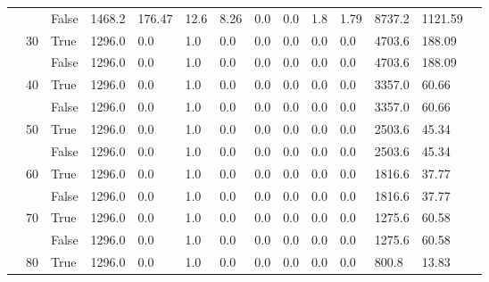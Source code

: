 \documentclass{article}
\begin{document}
\begin{landscape}
\begin{small}
\begin{longtable}[c]{@{}lll|ll|ll|ll|ll|lll@{}}
   &    & False & 1468.2          & 176.47         & 12.6          & 8.26          & 0.0           & 0.0           & 1.8           & 1.79          & 8737.2        & 1121.59     &  \\
   & 30 & True  & 1296.0          & 0.0            & 1.0           & 0.0           & 0.0           & 0.0           & 0.0           & 0.0           & 4703.6        & 188.09      &  \\
   &    & False & 1296.0          & 0.0            & 1.0           & 0.0           & 0.0           & 0.0           & 0.0           & 0.0           & 4703.6        & 188.09      &  \\
   & 40 & True  & 1296.0          & 0.0            & 1.0           & 0.0           & 0.0           & 0.0           & 0.0           & 0.0           & 3357.0        & 60.66       &  \\
   &    & False & 1296.0          & 0.0            & 1.0           & 0.0           & 0.0           & 0.0           & 0.0           & 0.0           & 3357.0        & 60.66       &  \\
   & 50 & True  & 1296.0          & 0.0            & 1.0           & 0.0           & 0.0           & 0.0           & 0.0           & 0.0           & 2503.6        & 45.34       &  \\
   &    & False & 1296.0          & 0.0            & 1.0           & 0.0           & 0.0           & 0.0           & 0.0           & 0.0           & 2503.6        & 45.34       &  \\
   & 60 & True  & 1296.0          & 0.0            & 1.0           & 0.0           & 0.0           & 0.0           & 0.0           & 0.0           & 1816.6        & 37.77       &  \\
   &    & False & 1296.0          & 0.0            & 1.0           & 0.0           & 0.0           & 0.0           & 0.0           & 0.0           & 1816.6        & 37.77       &  \\
   & 70 & True  & 1296.0          & 0.0            & 1.0           & 0.0           & 0.0           & 0.0           & 0.0           & 0.0           & 1275.6        & 60.58       &  \\
   &    & False & 1296.0          & 0.0            & 1.0           & 0.0           & 0.0           & 0.0           & 0.0           & 0.0           & 1275.6        & 60.58       &  \\
   & 80 & True  & 1296.0          & 0.0            & 1.0           & 0.0           & 0.0           & 0.0           & 0.0           & 0.0           & 800.8         & 13.83       &  \\

\end{longtable}
\end{small}
\end{landscape}
\end{document}
